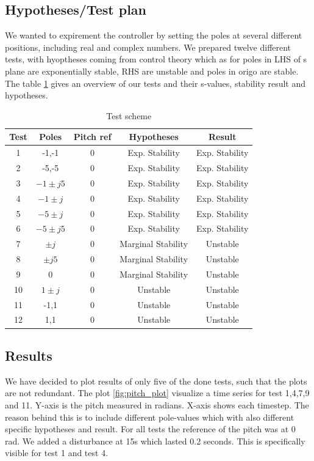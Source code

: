 \subsection{Hypotheses/Test plan}
We wanted to expirement the controller by setting the poles at several different positions, including real and complex numbers.
We prepared twelve different tests, with hyoptheses coming from control theory which as for poles in LHS of s plane are exponentially stable, RHS are unstable and poles in origo are stable.
The table \ref{tab:testskjema_lab1} gives an overview of our tests and their s-values, stability result and hypotheses.
\begin{table}[h]
\centering
{} %
    \begin{tabular}{||c c c c c||} 
     \hline
     Test & Poles & Pitch ref & Hypotheses & Result \\ [0.5ex] 
     \hline\hline
     1 & -1,-1 & 0 & Exp. Stability & Exp. Stability \\ 
     \hline
     2 & -5,-5 & 0 & Exp. Stability & Exp. Stability \\
     \hline
     3 & $-1\pm j5$  & 0 & Exp. Stability & Exp. Stability  \\
     \hline
     4 & $-1\pm j$ & 0 & Exp. Stability & Exp. Stability \\
     \hline
     5 & $-5\pm j$ & 0 & Exp. Stability & Exp. Stability \\  
     \hline
     6 & $-5\pm j5$ & 0 & Exp. Stability & Exp. Stability \\ 
     \hline
     7 & $\pm j$ & 0 & Marginal Stability & Unstable \\  
     \hline
     8 & $\pm j5$ & 0 & Marginal Stability & Unstable \\ 
     \hline
     9 & $0$ & 0 & Marginal Stability & Unstable \\ 
     \hline
     10 & $1\pm j$ & 0 & Unstable & Unstable \\ 
     \hline
     11 & -1,1 & 0 & Unstable & Unstable \\ 
     \hline
     12 & 1,1 & 0 & Unstable & Unstable \\ [1ex]
     \hline
    \end{tabular}
    \label{tab:testskjema_lab1}
    \caption{Test scheme}
\end{table}
\subsection{Results}
We have decided to plot results of only five of the done tests, such that the plots are not redundant.
The plot \ref{fig:pitch_plot} visualize a time series for test 1,4,7,9 and 11. Y-axis is the pitch measured in radians. X-axis shows each timestep. The reason behind this is to include different pole-values which
with also different specific hypotheses and result. For all tests the reference of the pitch was at 0 rad. We added a 
disturbance at 15s which lasted 0.2 seconds. This is specifically visible for test 1 and test 4.

